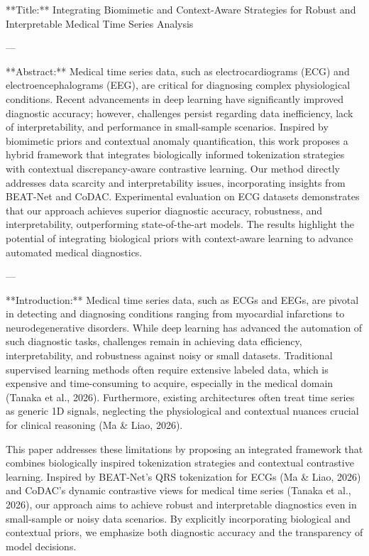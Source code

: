 **Title:**  
Integrating Biomimetic and Context-Aware Strategies for Robust and Interpretable Medical Time Series Analysis  

---

**Abstract:**  
Medical time series data, such as electrocardiograms (ECG) and electroencephalograms (EEG), are critical for diagnosing complex physiological conditions. Recent advancements in deep learning have significantly improved diagnostic accuracy; however, challenges persist regarding data inefficiency, lack of interpretability, and performance in small-sample scenarios. Inspired by biomimetic priors and contextual anomaly quantification, this work proposes a hybrid framework that integrates biologically informed tokenization strategies with contextual discrepancy-aware contrastive learning. Our method directly addresses data scarcity and interpretability issues, incorporating insights from BEAT-Net and CoDAC. Experimental evaluation on ECG datasets demonstrates that our approach achieves superior diagnostic accuracy, robustness, and interpretability, outperforming state-of-the-art models. The results highlight the potential of integrating biological priors with context-aware learning to advance automated medical diagnostics.

---

**Introduction:**  
Medical time series data, such as ECGs and EEGs, are pivotal in detecting and diagnosing conditions ranging from myocardial infarctions to neurodegenerative disorders. While deep learning has advanced the automation of such diagnostic tasks, challenges remain in achieving data efficiency, interpretability, and robustness against noisy or small datasets. Traditional supervised learning methods often require extensive labeled data, which is expensive and time-consuming to acquire, especially in the medical domain (Tanaka et al., 2026). Furthermore, existing architectures often treat time series as generic 1D signals, neglecting the physiological and contextual nuances crucial for clinical reasoning (Ma & Liao, 2026).

This paper addresses these limitations by proposing an integrated framework that combines biologically inspired tokenization strategies and contextual contrastive learning. Inspired by BEAT-Net's QRS tokenization for ECGs (Ma & Liao, 2026) and CoDAC's dynamic contrastive views for medical time series (Tanaka et al., 2026), our approach aims to achieve robust and interpretable diagnostics even in small-sample or noisy data scenarios. By explicitly incorporating biological and contextual priors, we emphasize both diagnostic accuracy and the transparency of model decisions.

